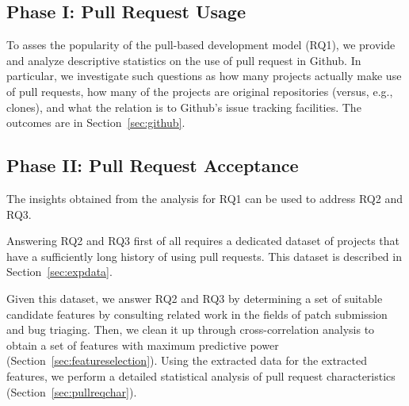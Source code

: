 \documentclass{sig-alternate}
\begin{document}
\subsection{Phase I: Pull Request Usage}

To asses the popularity of the pull-based development model (RQ1), we provide
and analyze descriptive statistics on the use of pull request in Github. In
particular, we investigate such questions as how many projects actually make use
of pull requests, how many of the projects are original repositories (versus,
e.g., clones), and what the relation is to Github's issue tracking facilities.
The outcomes are in Section~\ref{sec:github}.

\subsection{Phase II: Pull Request Acceptance}
\label{sec:expprocess}

The insights obtained from the analysis for RQ1 can be used to address
RQ2 and RQ3. 

Answering RQ2 and RQ3 first of all requires a dedicated dataset of
projects that have a sufficiently long history of using pull requests.
This dataset is described in Section~\ref{sec:expdata}.



% 




Given this dataset, we answer RQ2 and RQ3 by determining
a set of suitable candidate
features by consulting related work in the fields of patch submission and bug
triaging. Then, we clean it up through cross-correlation analysis to obtain a
set of features with maximum predictive power
(Section~\ref{sec:featureselection}). Using the extracted data for the 
extracted features, we perform a detailed statistical analysis of pull request
characteristics (Section~\ref{sec:pullreqchar}).
\end{document}
